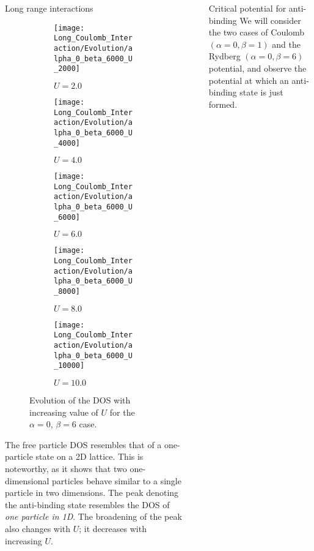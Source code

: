 \documentclass[final]{beamer}
\newlength{\sepwid}
\newlength{\onecolwid}
\begin{document}
\begin{frame}[t]
\begin{columns}[t]
\begin{column}{\onecolwid}
\begin{block}{Long range interactions}
\begin{figure}[p!]
\begin{subfigure}{0.3\linewidth}
	\end{subfigure}
	\begin{subfigure}{0.3\linewidth}
		\texttt{[image: Long\_Coulomb\_Interaction/Evolution/alpha\_0\_beta\_6000\_U\_2000]}
		\caption{$U = 2.0$}
	\end{subfigure}
	\begin{subfigure}{0.3\linewidth}
		\texttt{[image: Long\_Coulomb\_Interaction/Evolution/alpha\_0\_beta\_6000\_U\_4000]}
		\caption{$U = 4.0$}
	\end{subfigure}
	\begin{subfigure}{0.3\linewidth}
		\texttt{[image: Long\_Coulomb\_Interaction/Evolution/alpha\_0\_beta\_6000\_U\_6000]}
		\caption{$U = 6.0$}
	\end{subfigure}
	\begin{subfigure}{0.3\linewidth}
		\texttt{[image: Long\_Coulomb\_Interaction/Evolution/alpha\_0\_beta\_6000\_U\_8000]}
		\caption{$U = 8.0$}
	\end{subfigure}
	\begin{subfigure}{0.3\linewidth}
		\texttt{[image: Long\_Coulomb\_Interaction/Evolution/alpha\_0\_beta\_6000\_U\_10000]}
		\caption{$U = 10.0$}
	\end{subfigure}
	\caption{Evolution of the DOS with increasing value of $U$ for the $\alpha = 0$, $\beta = 6$ case.}
\end{figure}
The free particle DOS resembles that of a one-particle state on a 2D lattice. This is noteworthy, as it shows that two one-dimensional particles behave similar to a single particle in two dimensions. The peak denoting the anti-binding state resembles the DOS of \textit{one particle in 1D}. The broadening of the peak also changes with $U$; it decreases with increasing $U$.
\end{block}
	
\end{column}

\begin{column}{\sepwid}\end{column} %


\begin{column}{\onecolwid} %
	
\begin{block}{Critical potential for anti-binding}
We will consider the two cases of Coulomb $\left(\alpha = 0, \beta = 1\right)$ and the Rydberg $\left(\alpha = 0, \beta = 6\right)$ potential, and observe the potential at which an anti-binding state is just formed.


\end{block}
\end{column}
\end{columns}
\end{frame}
\end{document}
